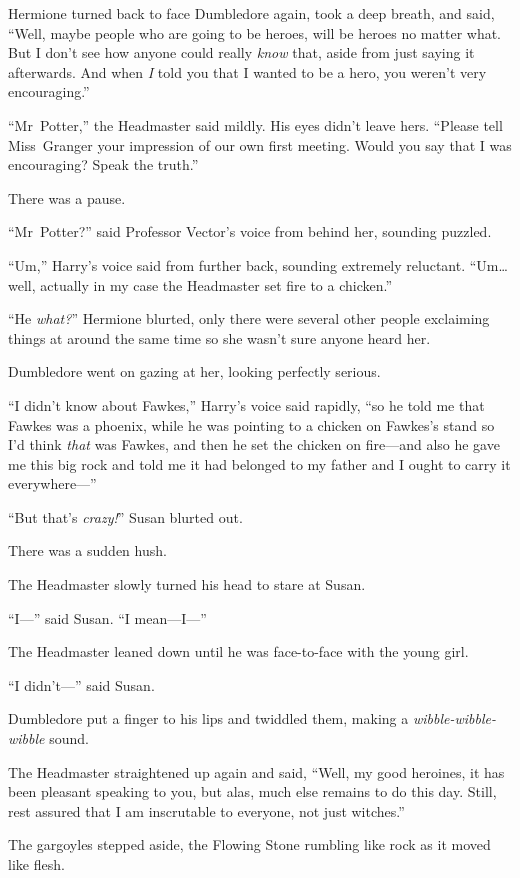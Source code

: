 Hermione turned back to face Dumbledore again, took a deep breath, and said, “Well, maybe people who are going to be heroes, will be heroes no matter what. But I don’t see how anyone could really \emph{know} that, aside from just saying it afterwards. And when \emph{I} told you that I wanted to be a hero, you weren’t very encouraging.”

“Mr~Potter,” the Headmaster said mildly. His eyes didn’t leave hers. “Please tell Miss~Granger your impression of our own first meeting. Would you say that I was encouraging? Speak the truth.”

There was a pause.

“Mr~Potter?” said Professor Vector’s voice from behind her, sounding puzzled.

“Um,” Harry’s voice said from further back, sounding extremely reluctant. “Um…well, actually in my case the Headmaster set fire to a chicken.”

“He \emph{what?}” Hermione blurted, only there were several other people exclaiming things at around the same time so she wasn’t sure anyone heard her.

Dumbledore went on gazing at her, looking perfectly serious.

“I didn’t know about Fawkes,” Harry’s voice said rapidly, “so he told me that Fawkes was a phoenix, while he was pointing to a chicken on Fawkes’s stand so I’d think \emph{that} was Fawkes, and then he set the chicken on fire—and also he gave me this big rock and told me it had belonged to my father and I ought to carry it everywhere—”

“But that’s \emph{crazy!}” Susan blurted out.

There was a sudden hush.

The Headmaster slowly turned his head to stare at Susan.

“I—” said Susan. “I mean—I—”

The Headmaster leaned down until he was face-to-face with the young girl.

“I didn’t—” said Susan.

Dumbledore put a finger to his lips and twiddled them, making a
\emph{wibble-wibble-wibble} sound.

The Headmaster straightened up again and said, “Well, my good heroines, it has been pleasant speaking to you, but alas, much else remains to do this day. Still, rest assured that I am inscrutable to everyone, not just witches.”

The gargoyles stepped aside, the Flowing Stone rumbling like rock as it moved like flesh.

